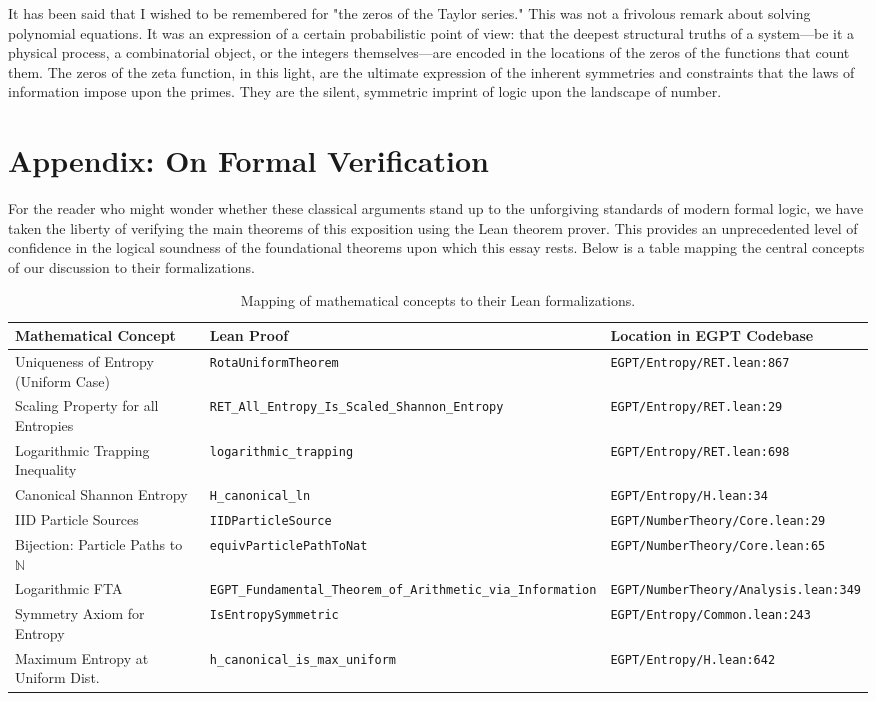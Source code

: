 \documentclass[12pt]{article}
\begin{document}
It has been said that I wished to be remembered for "the zeros of the Taylor series." This was not a frivolous remark about solving polynomial equations. It was an expression of a certain probabilistic point of view: that the deepest structural truths of a system—be it a physical process, a combinatorial object, or the integers themselves—are encoded in the locations of the zeros of the functions that count them. The zeros of the zeta function, in this light, are the ultimate expression of the inherent symmetries and constraints that the laws of information impose upon the primes. They are the silent, symmetric imprint of logic upon the landscape of number.

\newpage

\appendix
\section{Appendix: On Formal Verification}

For the reader who might wonder whether these classical arguments stand up to the unforgiving standards of modern formal logic, we have taken the liberty of verifying the main theorems of this exposition using the Lean theorem prover. This provides an unprecedented level of confidence in the logical soundness of the foundational theorems upon which this essay rests. Below is a table mapping the central concepts of our discussion to their formalizations.

\begin{table}[h]
\centering
\begin{tabular}{|p{4.5cm}|p{4cm}|p{4.5cm}|}
\hline
\textbf{Mathematical Concept} & \textbf{Lean Proof} & \textbf{Location in EGPT Codebase} \\
\hline
Uniqueness of Entropy (Uniform Case) & \texttt{RotaUniformTheorem} & \texttt{EGPT/Entropy/RET.lean:867} \\
Scaling Property for all Entropies & \texttt{RET\_All\_Entropy\_Is\_Scaled\_Shannon\_Entropy} & \texttt{EGPT/Entropy/RET.lean:29} \\
Logarithmic Trapping Inequality & \texttt{logarithmic\_trapping} & \texttt{EGPT/Entropy/RET.lean:698} \\
Canonical Shannon Entropy & \texttt{H\_canonical\_ln} & \texttt{EGPT/Entropy/H.lean:34} \\
IID Particle Sources & \texttt{IIDParticleSource} & \texttt{EGPT/NumberTheory/Core.lean:29} \\
Bijection: Particle Paths to $\mathbb{N}$ & \texttt{equivParticlePathToNat} & \texttt{EGPT/NumberTheory/Core.lean:65} \\
Logarithmic FTA & \texttt{EGPT\_Fundamental\_Theorem\_of\_Arithmetic\_via\_Information} & \texttt{EGPT/NumberTheory/Analysis.lean:349} \\
Symmetry Axiom for Entropy & \texttt{IsEntropySymmetric} & \texttt{EGPT/Entropy/Common.lean:243} \\
Maximum Entropy at Uniform Dist. & \texttt{h\_canonical\_is\_max\_uniform} & \texttt{EGPT/Entropy/H.lean:642} \\
\hline
\end{tabular}
\caption{Mapping of mathematical concepts to their Lean formalizations.}
\end{table}
\end{document}
